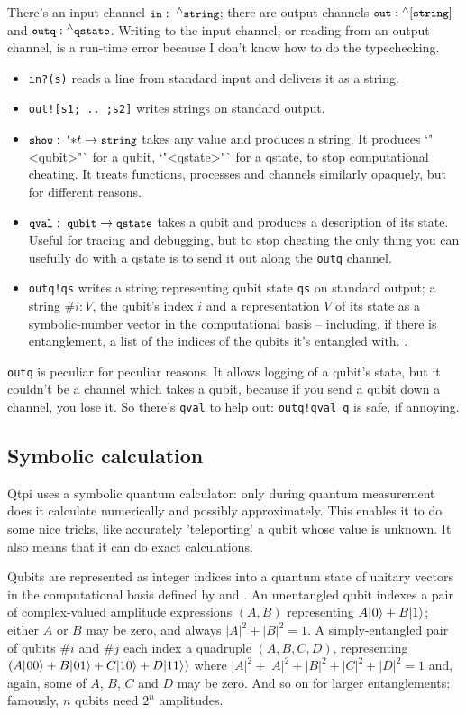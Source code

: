 \documentclass[11pt,a4paper]{article}
\newcommand{\verbtt}[1]{\texttt{\small{}#1}}
\newcommand{\caret}[0]{\ensuremath{{}^{\wedge}}}
\begin{document}
There's an input channel $\verbtt{in}:\; \caret{}\verbtt{string}$; there are output channels $\verbtt{out}: \caret{}[\verbtt{string}]$ and $\verbtt{outq}: \caret{}\verbtt{qstate}$. Writing to the input channel, or reading from an output channel, is a run-time error because I don't know how to do the typechecking.
\begin{itemize}
\item \verbtt{in?(s)} reads a line from standard input and delivers it as a string. 
\item \verbtt{out![s1; .. ;s2]} writes strings on standard output. 
\item $\verbtt{show}:\; '{*}t->\verbtt{string}$ takes any value and produces a string. It produces `"<qubit>"` for a qubit, `"<qstate>"` for a qstate, to stop computational cheating. It treats functions, processes and channels similarly opaquely, but for different reasons.
\item $\verbtt{qval}:\; \verbtt{qubit} ->\verbtt{qstate}$ takes a qubit and produces a description of its state. Useful for tracing and debugging, but to stop cheating the only thing you can usefully do with a qstate is to send it out along the \verbtt{outq} channel.
\item \verbtt{outq!qs} writes a string representing qubit state \verbtt{qs} on standard output; a string $\#i:V$, the qubit's index $i$ and a representation $V$ of its state as a symbolic-number vector in the computational basis -- including, if there is entanglement, a list of the indices of the qubits it's entangled with.
.
\end{itemize}

\verbtt{outq} is peculiar for peculiar reasons. It allows logging of a qubit's state, but it couldn't be a channel which takes a qubit, because if you send a qubit down a channel, you lose it. So there's \verbtt{qval} to help out: \verbtt{outq!qval q} is safe, if annoying. 

\subsection{Symbolic calculation}

Qtpi uses a symbolic quantum calculator: only during quantum measurement does it calculate numerically and possibly approximately. This enables it to do some nice tricks, like accurately 'teleporting' a qubit whose value is unknown. It also means that it can do exact calculations.

Qubits are represented as integer indices into a quantum state of unitary vectors in the computational basis defined by \zero and \one. An unentangled qubit indexes a pair of complex-valued amplitude expressions $(A, B)$ representing $A|\hspace{0.5pt}0\rangle+B|1\rangle$; either $A$ or $B$ may be zero, and always $|A|^{2}+|B|^{2}=1$. A simply-entangled pair of qubits $\#i$ and $\#j$ each index a quadruple $(A,B,C,D)$, representing $(A|\hspace{0.5pt}00\rangle+B|\hspace{0.5pt}01\rangle+C|10\rangle+D|11\rangle)$ where $|A|^{2}+|A|^{2}+|B|^{2}+|C|^{2}+|D|^{2}=1$ and, again, some of $A$, $B$, $C$ and $D$ may be zero. And so on for larger entanglements: famously, $n$ qubits need $2^{n}$ amplitudes.
\end{document}
